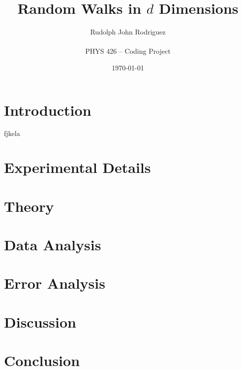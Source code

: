 \documentclass{article}
\title{Random Walks in $d$ Dimensions}
\author{Rudolph John Rodriguez \\ \\  PHYS 426 -- Coding Project}
\date{\today}
\begin{document}
\maketitle

\section{Introduction}
fjkela
\section{Experimental Details}

\section{Theory}

\section{Data Analysis}

\section{Error Analysis}

\section{Discussion}

\section{Conclusion}
\end{document}
